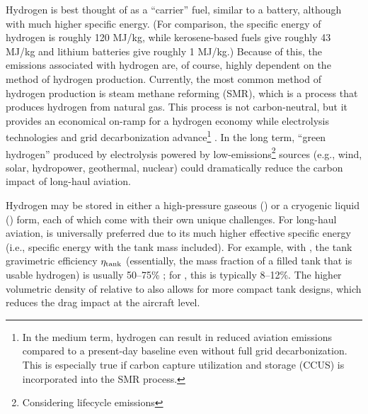 Hydrogen is best thought of as a ``carrier'' fuel, similar to a battery, although with much higher specific energy. (For comparison, the specific energy of hydrogen is roughly 120 MJ/kg, while kerosene-based fuels give roughly 43 MJ/kg and lithium batteries give roughly 1 MJ/kg.) Because of this, the emissions associated with hydrogen are, of course, highly dependent on the method of hydrogen production. Currently, the most common method of hydrogen production is steam methane reforming (SMR), which is a process that produces hydrogen from natural gas. This process is not carbon-neutral, but it provides an economical on-ramp for a hydrogen economy while electrolysis technologies and grid decarbonization advance\footnote{In the medium term, hydrogen can result in reduced aviation emissions compared to a present-day baseline even without full grid decarbonization. This is especially true if carbon capture utilization and storage (CCUS) is incorporated into the SMR process.} \cite{cascade}. In the long term, ``green hydrogen'' produced by electrolysis powered by low-emissions\footnote{Considering lifecycle emissions} sources (e.g., wind, solar, hydropower, geothermal, nuclear) could dramatically reduce the carbon impact of long-haul aviation.

Hydrogen may be stored in either a high-pressure gaseous (\gh) or a cryogenic liquid (\lh) form, each of which come with their own unique challenges. For long-haul aviation, \lh is universally preferred due to its much higher effective specific energy (i.e., specific energy with the tank mass included). For example, with \lh, the tank gravimetric efficiency $\eta_{\rm tank}$ (essentially, the mass fraction of a filled tank that is usable hydrogen) is usually 50--75\% \cite{brewer_hydrogen_1991}; for \gh, this is typically 8--12\%. The higher volumetric density of \lh relative to \gh also allows for more compact tank designs, which reduces the drag impact at the aircraft level.

